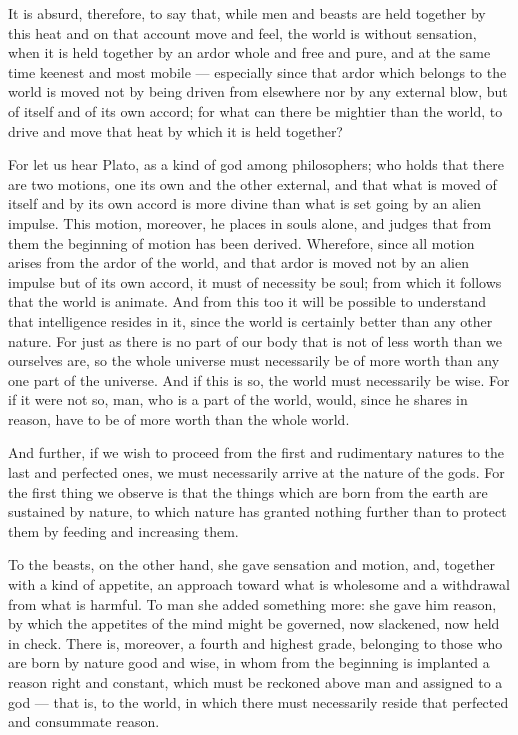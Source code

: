  It is absurd, therefore, to say that, while men and beasts are held together by this heat and on that account move and feel, the world is without sensation, when it is held together by an ardor whole and free and pure, and at the same time keenest and most mobile — especially since that ardor which belongs to the world is moved not by being driven from elsewhere nor by any external blow, but of itself and of its own accord; for what can there be mightier than the world, to drive and move that heat by which it is held together?

 For let us hear Plato, as a kind of god among philosophers; who holds that there are two motions, one its own and the other external, and that what is moved of itself and by its own accord is more divine than what is set going by an alien impulse. This motion, moreover, he places in souls alone, and judges that from them the beginning of motion has been derived. Wherefore, since all motion arises from the ardor of the world, and that ardor is moved not by an alien impulse but of its own accord, it must of necessity be soul; from which it follows that the world is animate. And from this too it will be possible to understand that intelligence resides in it, since the world is certainly better than any other nature. For just as there is no part of our body that is not of less worth than we ourselves are, so the whole universe must necessarily be of more worth than any one part of the universe. And if this is so, the world must necessarily be wise. For if it were not so, man, who is a part of the world, would, since he shares in reason, have to be of more worth than the whole world.

 And further, if we wish to proceed from the first and rudimentary natures to the last and perfected ones, we must necessarily arrive at the nature of the gods. For the first thing we observe is that the things which are born from the earth are sustained by nature, to which nature has granted nothing further than to protect them by feeding and increasing them.

 To the beasts, on the other hand, she gave sensation and motion, and, together with a kind of appetite, an approach toward what is wholesome and a withdrawal from what is harmful. To man she added something more: she gave him reason, by which the appetites of the mind might be governed, now slackened, now held in check. There is, moreover, a fourth and highest grade, belonging to those who are born by nature good and wise, in whom from the beginning is implanted a reason right and constant, which must be reckoned above man and assigned to a god — that is, to the world, in which there must necessarily reside that perfected and consummate reason.

